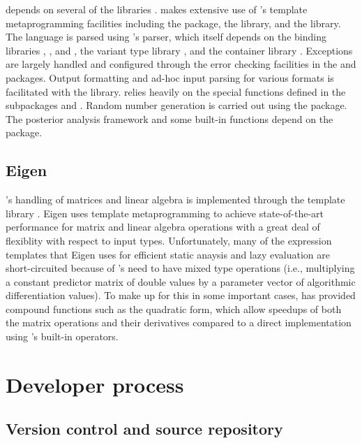 \documentclass[article]{jss}
\begin{document}
 depends on several of the  
libraries \citep{Boost:2011}.   makes extensive use of
's template metaprogramming facilities including the
 package, the  library, and the
 library.  The  language is parsed
using 's  parser, which itself depends on
the binding libraries , , and ,
the variant type library , and the container library
.  Exceptions are largely handled and configured through
the error checking facilities in the  and
 packages.  Output formatting and ad-hoc input parsing
for various formats is facilitated with the  library.
 relies heavily on the special functions defined in the
 subpackages  and .  Random number generation is carried out using the
 package.  The posterior analysis framework and some
built-in functions depend on the  package.

\subsection{Eigen}

's handling of matrices and linear algebra is
implemented through the   template library
\citep{Eigen:2012}.  Eigen uses template metaprogramming to achieve
state-of-the-art performance for matrix and linear algebra operations
with a great deal of flexiblity with respect to input types.
Unfortunately, many of the expression templates that Eigen uses for
efficient static anaysis and lazy evaluation are short-circuited
because of 's need to have mixed type operations (i.e.,
multiplying a constant predictor matrix of double values by a
parameter vector of algorithmic differentiation values).  To make up for
this in some important cases,  has provided compound
functions such as the quadratic form, which allow speedups of both the
matrix operations and their derivatives compared to a direct
implementation using 's built-in operators.


\section{Developer process}

\subsection{Version control and source repository}
\end{document}
